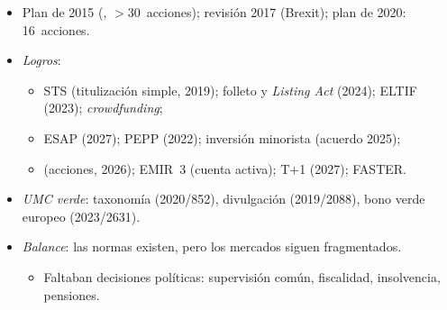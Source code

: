\documentclass{article}
\begin{document}
\begin{columnas}
\begin{itemize}
\item Plan de 2015 (, $>$30~acciones); revisión 2017 (Brexit); plan de 2020: 16~acciones.
\item \emph{Logros}:
  \begin{itemize}
  \item STS (titulización simple, 2019); folleto y \emph{Listing Act} (2024); ELTIF (2023); \emph{crowdfunding};
  \item ESAP (2027); PEPP (2022); inversión minorista (acuerdo 2025);
  \item {} (acciones, 2026); EMIR~3 (cuenta activa); T+1 (2027); FASTER.
  \end{itemize}
\item \emph{UMC verde}: taxonomía (2020/852), divulgación (2019/2088), bono verde europeo (2023/2631).
\item \emph{Balance}: las normas existen, pero los mercados siguen fragmentados.
  \begin{itemize}
  \item Faltaban decisiones políticas: supervisión común, fiscalidad, insolvencia, pensiones.
  \end{itemize}
\end{itemize}


\end{columnas}
\end{document}
